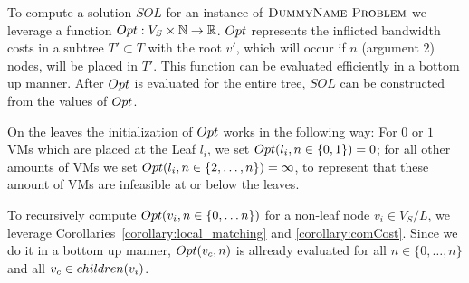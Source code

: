 \documentclass[9pt,twocolumn]{scrartcl}
\newcommand{\Chunk}{\ensuremath{c}}
\newcommand{\Problem}{\textsc{DummyName Problem}}
\newcommand{\ChunkLocation}{\ensuremath{\textsc{loc}}}
\newcommand{\SubstrateNodes}{\ensuremath{V_S}}
\newcommand{\SubstrateNode}{\ensuremath{v}}
\newcommand{\Leaf}{\ensuremath{l}}
\newcommand{\Leaves}{\ensuremath{L}}
\newcommand{\Chunks}{\ensuremath{\textsc{chunks}}}
\newcommand{\Bandwidth}{\ensuremath{bw}}
\newcommand{\Tree}{\ensuremath{T}}
\newcommand{\Vms}{\ensuremath{n}}
\newcommand{\Sol}{\ensuremath{SOL}}
\begin{document}
To compute a solution $\Sol$ for an instance of $\Problem$ we leverage a
function $\Opt : \SubstrateNodes \times \mathbb{N} \rightarrow \mathbb{R}$.
$Opt$ represents the inflicted bandwidth costs in a subtree $\Tree' \subset
\Tree$ with the root $\SubstrateNode'$, which will occur if $n$ (argument 2)
nodes, will be placed in $\Tree'$.
This
function can be evaluated
efficiently in a bottom up manner. After $Opt$ is evaluated for the entire
tree, $\Sol$ can be constructed from the values of $Opt$.

On the leaves the initialization of $Opt$
works in the following way: For $0$ or
$1$ VMs which are placed at the Leaf $\Leaf_i$, we set $\Opt(\Leaf_i, n \in
\{0,1\}) = 0$; for all other amounts of VMs we set $\Opt(\Leaf_i, n \in
\{2,\dots,\Vms\}) = \infty$, to represent that these amount of VMs are
infeasible at or below the leaves.

To recursively compute $\Opt(\SubstrateNode_i, n \in \{0,\dots\Vms\})$ for a
non-leaf node $\SubstrateNode_i \in \SubstrateNodes / \Leaves$, we leverage
Corollaries~\ref{corollary:local_matching} and \ref{corollary:comCost}. Since
we do it in a bottom up manner, $\Opt(\SubstrateNode_c, n)$
is allready evaluated for all $n \in \{0,\dots,\Vms\}$ and all
$\SubstrateNode_c \in \Children(\SubstrateNode_i)$.
\end{document}
